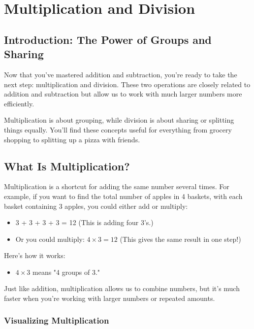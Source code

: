 \chapter{Multiplication and Division}

\section{Introduction: The Power of Groups and Sharing}
Now that you’ve mastered addition and subtraction, you’re ready to take the next step: multiplication and division. These two operations are closely related to addition and subtraction but allow us to work with much larger numbers more efficiently.

Multiplication is about grouping, while division is about sharing or splitting things equally. You’ll find these concepts useful for everything from grocery shopping to splitting up a pizza with friends.

\section{What Is Multiplication?}
Multiplication is a shortcut for adding the same number several times. For example, if you want to find the total number of apples in 4 baskets, with each basket containing 3 apples, you could either add or multiply:
\begin{itemize}
    \item 3 + 3 + 3 + 3 = 12 (This is adding four 3’s.)
    \item Or you could multiply: $4 \times 3 = 12$ (This gives the same result in one step!)
\end{itemize}

Here’s how it works:
\begin{itemize}
    \item $4 \times 3$ means "4 groups of 3."
\end{itemize}

Just like addition, multiplication allows us to combine numbers, but it’s much faster when you’re working with larger numbers or repeated amounts.

\subsection{Visualizing Multiplication}
\begin{center}
\end{center}

